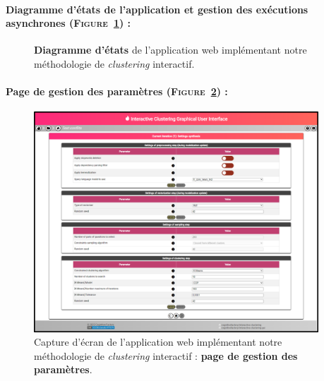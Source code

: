 	\paragraph{Diagramme d'états de l'application et gestion des exécutions asynchrones (\textsc{Figure~\ref{figure:C-WEB-APPLICATION-DIAGRAMME-ETATS}}) :}
	
		\begin{figure}[H]
			\centering
			\caption{
				\textbf{Diagramme d'états} de l'application web implémentant notre méthodologie de \textit{clustering} interactif.
			}
			\label{figure:C-WEB-APPLICATION-DIAGRAMME-ETATS}
		\end{figure}
	
	
	\newpage
	\paragraph{Page de gestion des paramètres (\textsc{Figure~\ref{figure:C-WEB-APPLICATION-PARAMETRAGE}}) :}
	
		\begin{figure}[H]
			\centering
			\includegraphics[width=0.95\textwidth]{figures/interactive-clustering-application-parametres}
			\caption{
				Capture d'écran de l'application web implémentant notre méthodologie de \textit{clustering} interactif : \textbf{page de gestion des paramètres}.
			}
			\label{figure:C-WEB-APPLICATION-PARAMETRAGE}
		\end{figure}
	
